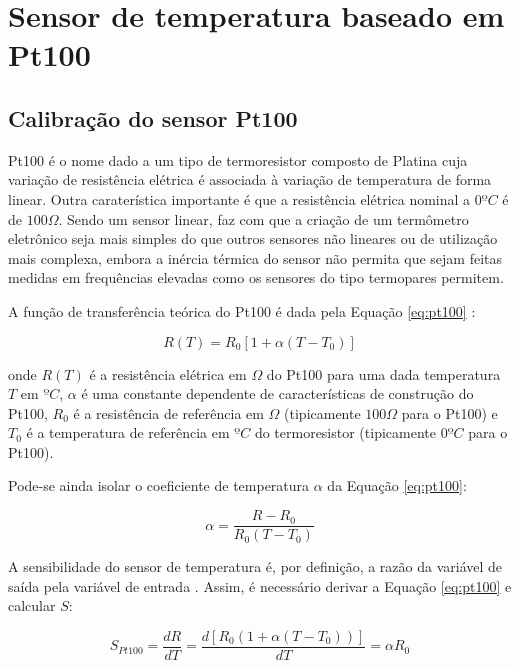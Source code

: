 \documentclass[a4paper]{instrumentacao}
\begin{document}
\section{Sensor de temperatura baseado em Pt100}
\label{ch:pt100}

\subsection{Calibração do sensor Pt100}
\label{sec:resistencia-pt100}

Pt100 é o nome dado a um tipo de termoresistor composto de Platina cuja variação de resistência elétrica é associada à variação de temperatura de forma linear. Outra caraterística importante é que a resistência elétrica nominal a $0ºC$ é de $100 \Omega$. Sendo um sensor linear, faz com que a criação de um termômetro eletrônico seja mais simples do que outros sensores não lineares ou de utilização mais complexa, embora a inércia térmica do sensor não permita que sejam feitas medidas em frequências elevadas como os sensores do tipo termopares permitem.

A função de transferência teórica do Pt100 é dada pela Equação \ref{eq:pt100} \cite{livro-texto}:

\begin{equation}
	R(T) = R_0 \left[1 + \alpha\left(T - T_0\right)\right]
	\label{eq:pt100}
\end{equation}

\noindent
onde $R(T)$ é a resistência elétrica em $\Omega$ do Pt100 para uma dada temperatura $T$ em $ºC$, $\alpha$ é uma constante dependente de características de construção do Pt100, $R_0$ é a resistência de referência em $\Omega$ (tipicamente $100 \Omega$ para o Pt100) e $T_0$ é a temperatura de referência em $ºC$ do termoresistor (tipicamente $0ºC$ para o Pt100).

Pode-se ainda isolar o coeficiente de temperatura $\alpha$ da Equação \ref{eq:pt100}:

\begin{equation}
	\alpha=\frac{R-R_0}{R_0(T-T_0)}
	\label{eq:pt100-alpha}
\end{equation}

A sensibilidade do sensor  de temperatura é, por definição, a razão da variável de saída pela variável de entrada \cite{livro-texto}. Assim, é necessário derivar a Equação \ref{eq:pt100} e calcular $S$:

\begin{equation}
	S_{Pt100}=\frac{dR}{dT}=\frac{d[R_0(1+\alpha(T-T_0))]}{dT}=\alpha R_0
	\label{eq:pt100-sensibilidade}
\end{equation}
\end{document}
